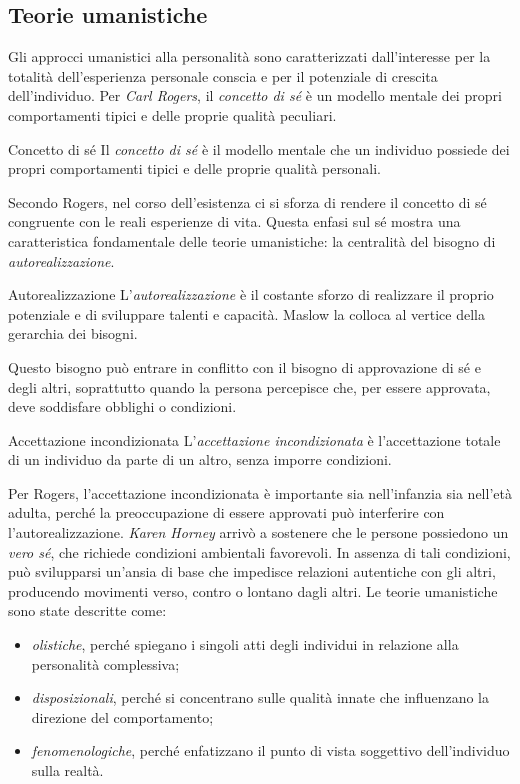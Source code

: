 \documentclass[a4paper]{article}
\begin{document}
\subsection{Teorie umanistiche}
Gli approcci umanistici alla personalità sono caratterizzati dall'interesse per la totalità dell'esperienza personale conscia e per il potenziale di crescita dell'individuo.
Per \emph{Carl Rogers}, il \emph{concetto di sé} è un modello mentale dei propri comportamenti tipici e delle proprie qualità peculiari.
\begin{snippetdefinition}{Concetto di sé}
    Il \emph{concetto di sé} è il modello mentale che un individuo possiede dei propri comportamenti tipici e delle proprie qualità personali.
\end{snippetdefinition}
Secondo Rogers, nel corso dell'esistenza ci si sforza di rendere il concetto di sé congruente con le reali esperienze di vita. Questa enfasi sul sé mostra una caratteristica fondamentale delle teorie umanistiche: la centralità del bisogno di \emph{autorealizzazione}.
\begin{snippetdefinition}{Autorealizzazione}
    L'\emph{autorealizzazione} è il costante sforzo di realizzare il proprio potenziale e di sviluppare talenti e capacità. Maslow la colloca al vertice della gerarchia dei bisogni.
\end{snippetdefinition}
Questo bisogno può entrare in conflitto con il bisogno di approvazione di sé e degli altri, soprattutto quando la persona percepisce che, per essere approvata, deve soddisfare obblighi o condizioni.
\begin{snippetdefinition}{Accettazione incondizionata}
    L'\emph{accettazione incondizionata} è l'accettazione totale di un individuo da parte di un altro, senza imporre condizioni.
\end{snippetdefinition}
Per Rogers, l'accettazione incondizionata è importante sia nell'infanzia sia nell'età adulta, perché la preoccupazione di essere approvati può interferire con l'autorealizzazione.
\emph{Karen Horney} arrivò a sostenere che le persone possiedono un \emph{vero sé}, che richiede condizioni ambientali favorevoli. In assenza di tali condizioni, può svilupparsi un'ansia di base che impedisce relazioni autentiche con gli altri, producendo movimenti verso, contro o lontano dagli altri.
Le teorie umanistiche sono state descritte come:
\begin{itemize}
    \item \emph{olistiche}, perché spiegano i singoli atti degli individui in relazione alla personalità complessiva;
    \item \emph{disposizionali}, perché si concentrano sulle qualità innate che influenzano la direzione del comportamento;
    \item \emph{fenomenologiche}, perché enfatizzano il punto di vista soggettivo dell'individuo sulla realtà.
\end{itemize}
\end{document}
